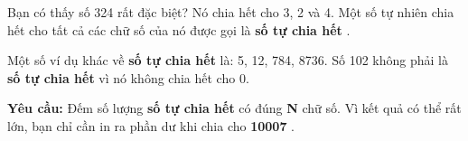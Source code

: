 Bạn có thấy số 324 rất đặc biệt? Nó chia hết cho 3, 2 và 4. Một số tự nhiên chia hết cho tất cả các chữ số của nó được gọi là \textbf{ số tự chia hết } .

Một số ví dụ khác về \textbf{ số tự chia hết } là: 5, 12, 784, 8736. Số 102 không phải là \textbf{ số tự chia hết } vì nó không chia hết cho 0.

\textbf{Yêu cầu: } Đếm số lượng \textbf{ số tự chia hết } có đúng \textbf{ N } chữ số. Vì kết quả có thể rất lớn, bạn chỉ cần in ra phần dư khi chia cho \textbf{ 10007 } . \textbf{}